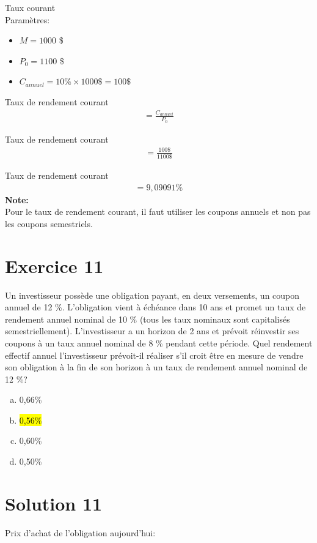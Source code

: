 \documentclass[10pt,a4paper]{article}
\begin{document}
Taux courant \\

Paramètres:
\begin{itemize}
\item $M = 1000$ \$
\item $P_0 = 1 100$ \$
\item $C_{annuel} = 10 \% \times 1000 \$ = 100 \$$
\end{itemize}

Taux de rendement courant
\begin{align*}
= \frac{C_{annuel}}{P_0}
\end{align*} 

Taux de rendement courant 
\begin{align*}
= \frac{100\$}{1100\$}
\end{align*} 

Taux de rendement courant 
\begin{align*}
= 9,09091 \%
\end{align*} 
\textbf{Note:} \\ Pour le taux de rendement courant,  il faut utiliser les coupons annuels et non pas les coupons semestriels.

\newpage


\section*{Exercice 11}
Un investisseur possède une obligation payant, en deux versements, un coupon annuel de 12 \%.  L’obligation vient à échéance dans 10 ans et promet un taux de rendement annuel nominal de 10 \% (tous les taux nominaux sont capitalisés semestriellement).  L’investisseur a un horizon de 2 ans et prévoit réinvestir ses coupons à un taux annuel nominal de 8 \% pendant cette période.  Quel rendement effectif annuel l’investisseur prévoit-il réaliser s’il croit être en mesure de vendre son obligation à la fin de son horizon à un taux de rendement annuel nominal de 12 \%?

\begin{enumerate}[a)]
\item 0,66\%
\item \hl{0,56\%}
\item 0,60\%
\item 0,50\%
\end{enumerate}

\section*{Solution 11 }
Prix d'achat de l'obligation aujourd'hui:\\
\end{document}
